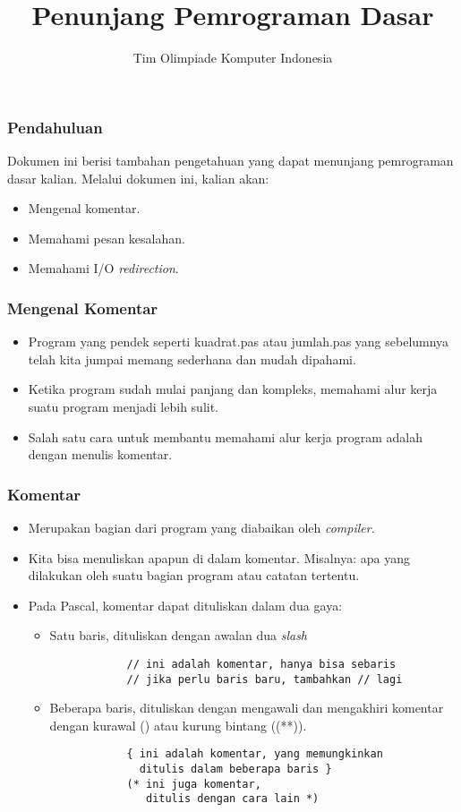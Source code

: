 \documentclass{beamer}
\title{Penunjang Pemrograman Dasar}
\author{Tim Olimpiade Komputer Indonesia}
\begin{document}
\begin{frame}
\titlepage
\end{frame}

\begin{frame}
\frametitle{Pendahuluan}
Dokumen ini berisi tambahan pengetahuan yang dapat menunjang pemrograman dasar kalian.\newline
Melalui dokumen ini, kalian akan:
\begin{itemize}
	\item Mengenal komentar.
	\item Memahami pesan kesalahan.
	\item Memahami I/O \textit{redirection}.
\end{itemize}
\end{frame}

\begin{frame}
\frametitle{Mengenal Komentar}
\begin{itemize}
	\item Program yang pendek seperti kuadrat.pas atau jumlah.pas yang sebelumnya telah kita jumpai memang sederhana dan mudah dipahami.
	\item Ketika program sudah mulai panjang dan kompleks, memahami alur kerja suatu program menjadi lebih sulit.
	\item Salah satu cara untuk membantu memahami alur kerja program adalah dengan menulis komentar.
\end{itemize}
\end{frame}

\begin{frame}[fragile]
\frametitle{Komentar}
\begin{itemize}
	\item Merupakan bagian dari program yang diabaikan oleh \textit{compiler}.
	\item Kita bisa menuliskan apapun di dalam komentar. Misalnya: apa yang dilakukan oleh suatu bagian program atau catatan tertentu.
	\item Pada Pascal, komentar dapat dituliskan dalam dua gaya:
	\begin{itemize}
		\item Satu baris, dituliskan dengan awalan dua \textit{slash}
		\begin{lstlisting}
			// ini adalah komentar, hanya bisa sebaris
			// jika perlu baris baru, tambahkan // lagi
		\end{lstlisting}
		\item Beberapa baris, dituliskan dengan mengawali dan mengakhiri komentar dengan kurawal ({}) atau kurung bintang ((**)). 
		\begin{lstlisting}
			{ ini adalah komentar, yang memungkinkan 
			  ditulis dalam beberapa baris }
			(* ini juga komentar, 
			   ditulis dengan cara lain *)
		\end{lstlisting}
	\end{itemize}
\end{itemize}
\end{frame}
\end{document}
